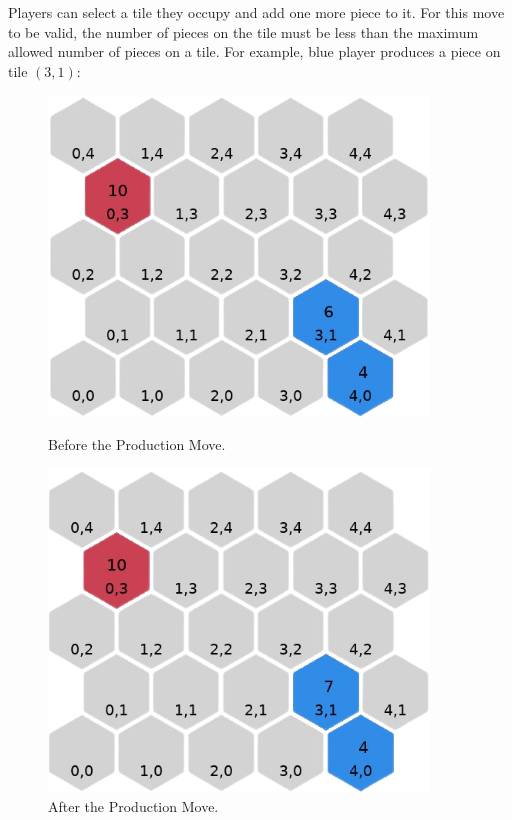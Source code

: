\documentclass[letterpaper, 12pt]{article}
\begin{document}
Players can select a tile they occupy and add one more piece to it. For this move to be
valid, the number of pieces on the tile must be less than the maximum allowed number of
pieces on a tile. For example, blue player produces a piece on tile \((3, 1)\):

\begin{figure}[H]
  \begin{minipage}[c]{.5\textwidth}
    \centering
    \includegraphics[width=0.9\textwidth]{production_example_1.png}
    \caption{Before the Production Move.}
  \end{minipage}%
  \begin{minipage}[c]{.5\textwidth} \centering
    \includegraphics[width=0.9\textwidth]{production_example_2.png}
    \caption{After the Production Move.}
  \end{minipage}
\end{figure}
\end{document}
